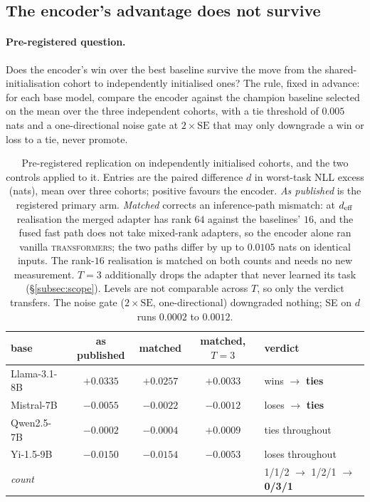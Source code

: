 \subsection{The encoder's advantage does not survive}
\label{subsec:q1}

\paragraph{Pre-registered question.} Does the encoder's win over the
best baseline survive the move from the shared-initialisation cohort to
independently initialised ones? The rule, fixed in advance: for each base
model, compare the encoder against the champion baseline selected on the
mean over the three independent cohorts, with a tie threshold of $0.005$
nats and a one-directional noise gate at $2\times\mathrm{SE}$ that may
only downgrade a win or loss to a tie, never promote.

\begin{table}[t]
\centering
\small
\caption{Pre-registered replication on independently initialised cohorts,
and the two controls applied to it. Entries are the paired difference $d$
in worst-task NLL excess (nats), mean over three cohorts; positive favours
the encoder. \emph{As published} is the registered primary arm.
\emph{Matched} corrects an inference-path mismatch: at $d_{\mathrm{eff}}$ realisation
the merged adapter has rank $64$ against the baselines' $16$, and the fused
fast path does not take mixed-rank adapters, so the encoder alone ran
vanilla \textsc{transformers}; the two paths differ by up to $0.0105$ nats
on identical inputs. The rank-$16$ realisation is matched on both counts
and needs no new measurement. $T = 3$ additionally drops the adapter that
never learned its task (\S\ref{subsec:scope}). Levels are not comparable
across $T$, so only the verdict transfers. The noise gate
($2\times\mathrm{SE}$, one-directional) downgraded nothing; SE on $d$ runs
$0.0002$ to $0.0012$.}
\label{tab:q1}
\begin{tabular}{lcccl}
\toprule
base & as published & matched & matched, $T=3$ & verdict \\
\midrule
Llama-3.1-8B & $+0.0335$ & $+0.0257$ & $+0.0033$ & wins $\to$ \textbf{ties} \\
Mistral-7B   & $-0.0055$ & $-0.0022$ & $-0.0012$ & loses $\to$ \textbf{ties} \\
Qwen2.5-7B   & $-0.0002$ & $-0.0004$ & $+0.0009$ & ties throughout \\
Yi-1.5-9B    & $-0.0150$ & $-0.0154$ & $-0.0053$ & loses throughout \\
\midrule
\multicolumn{4}{l}{\emph{count}} & 1/1/2 $\to$ 1/2/1 $\to$ \textbf{0/3/1} \\
\bottomrule
\end{tabular}
\end{table}

